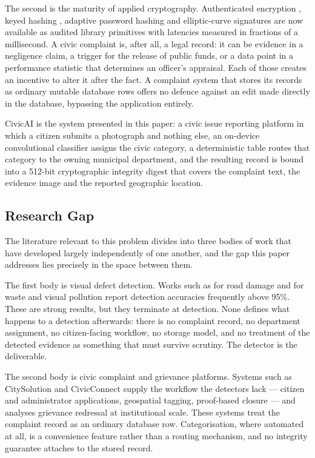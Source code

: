 \documentclass[conference]{IEEEtran}
\begin{document}
The second is the maturity of applied cryptography. Authenticated encryption \cite{mcgrew2004gcm}, keyed hashing \cite{krawczyk1997hmac, bellare1996keying}, adaptive password hashing \cite{provos1999bcrypt} and elliptic-curve signatures \cite{nist2023fips186, johnson2001ecdsa} are now available as audited library primitives with latencies measured in fractions of a millisecond. A civic complaint is, after all, a legal record: it can be evidence in a negligence claim, a trigger for the release of public funds, or a data point in a performance statistic that determines an officer's appraisal. Each of those creates an incentive to alter it after the fact. A complaint system that stores its records as ordinary mutable database rows offers no defence against an edit made directly in the database, bypassing the application entirely.

CivicAI is the system presented in this paper: a civic issue reporting platform in which a citizen submits a photograph and nothing else, an on-device convolutional classifier assigns the civic category, a deterministic table routes that category to the owning municipal department, and the resulting record is bound into a 512-bit cryptographic integrity digest that covers the complaint text, the evidence image and the reported geographic location.

\subsection{Research Gap}
The literature relevant to this problem divides into three bodies of work that have developed largely independently of one another, and the gap this paper addresses lies precisely in the space between them.

The first body is visual defect detection. Works such as \cite{l1potyolo, l2enhancedyolo, l3roadperception, l4realtimepothole} for road damage and \cite{l5multiclasswaste, l6householdgarbage, l7belugawaste, l8visualpollution} for waste and visual pollution report detection accuracies frequently above 95\%. These are strong results, but they terminate at detection. None defines what happens to a detection afterwards: there is no complaint record, no department assignment, no citizen-facing workflow, no storage model, and no treatment of the detected evidence as something that must survive scrutiny. The detector is the deliverable.

The second body is civic complaint and grievance platforms. Systems such as CitySolution \cite{l13citysolution} and CivicConnect \cite{l14civicconnect} supply the workflow the detectors lack --- citizen and administrator applications, geospatial tagging, proof-based closure --- and \cite{l15grievanceblockchain} analyses grievance redressal at institutional scale. These systems treat the complaint record as an ordinary database row. Categorisation, where automated at all, is a convenience feature rather than a routing mechanism, and no integrity guarantee attaches to the stored record.
\end{document}
